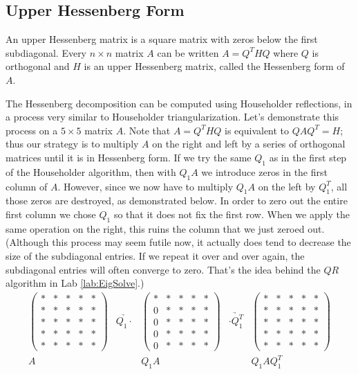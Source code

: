 \subsection*{Upper Hessenberg Form}
An upper Hessenberg matrix is a square matrix with zeros below the first subdiagonal.
Every  $n \times n$ matrix $A$ can be written $A = Q^THQ$ where $Q$ is orthogonal and $H$ is an upper Hessenberg matrix, called the Hessenberg form of $A$.

The Hessenberg decomposition can be computed using Householder reflections, in a process very similar to Householder triangularization.
Let's demonstrate this process on a $5 \times 5$ matrix $A$.
Note that $A=Q^THQ$ is equivalent to $QAQ^T = H$; thus our strategy is to multiply $A$ on the right and left by a series of orthogonal matrices until it is in Hessenberg form.
If we try the same $Q_1$ as in the first step of the Householder algorithm, then with $Q_1 A$ we introduce zeros in the first column of $A$.
However, since we now have to multiply $Q_1 A$ on the left by $Q_1^T$, all those zeros are destroyed, as demonstrated below.
In order to zero out the entire first column we chose $Q_1$ so that it does not fix the first row.
When we apply the same operation on the right, this ruins the column that we just zeroed out.
(Although this process may seem futile now, it actually does tend to decrease the size of the subdiagonal entries.
If we repeat it over and over again, the subdiagonal entries will often converge to zero.
That's the idea behind the $QR$ algorithm in Lab \ref{lab:EigSolve}.)
\[
\begin{array}{ccccc}
\begin{pmatrix}
* & * & * & * & * \\
* & * & * & * & * \\
* & * & * & * & * \\
* & * & * & * & * \\
* & * & * & * & *
\end{pmatrix}
&\underrightarrow{Q_1 \cdot }&
\begin{pmatrix}
* & * & * & * & * \\
0 & * & * & * & * \\
0 & * & * & * & * \\
0 & * & * & * & * \\
0 & * & * & * & *
\end{pmatrix}
&\underrightarrow{\cdot Q_1^T }&
\begin{pmatrix}
* & * & * & * & * \\
* & * & * & * & * \\
* & * & * & * & * \\
* & * & * & * & * \\
* & * & * & * & *
\end{pmatrix}
\\
A & & Q_1A & & Q_1 A Q_1^T
  \end{array}
\]
